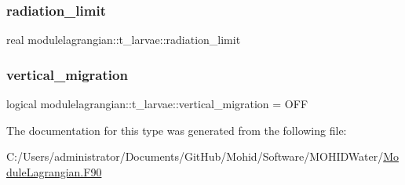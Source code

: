 \subsubsection{\texorpdfstring{radiation\+\_\+limit}{radiation\_limit}}
{\footnotesize\ttfamily real modulelagrangian\+::t\+\_\+larvae\+::radiation\+\_\+limit\hspace{0.3cm}{\ttfamily [private]}}

\mbox{\label{structmodulelagrangian_1_1t__larvae_abc29c35728a95f412aa597771f37d6e4}} 
\subsubsection{\texorpdfstring{vertical\+\_\+migration}{vertical\_migration}}
{\footnotesize\ttfamily logical modulelagrangian\+::t\+\_\+larvae\+::vertical\+\_\+migration = O\+FF\hspace{0.3cm}{\ttfamily [private]}}



The documentation for this type was generated from the following file\+:\begin{DoxyCompactItemize}
\item 
C\+:/\+Users/administrator/\+Documents/\+Git\+Hub/\+Mohid/\+Software/\+M\+O\+H\+I\+D\+Water/\mbox{\hyperlink{_module_lagrangian_8_f90}{Module\+Lagrangian.\+F90}}\end{DoxyCompactItemize}
